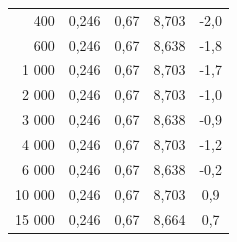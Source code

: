 \documentclass[a4paper, czech]{article}
\begin{document}
\begin{table}[H]
\begin{tabular}{rcccc}
        400        & 0,246                                                                       & 0,67                           & 8,703                                                        & -2,0                                                        \\
        600        & 0,246                                                                       & 0,67                           & 8,638                                                        & -1,8                                                        \\
        1 000       & 0,246                                                                       & 0,67                           & 8,703                                                        & -1,7                                                        \\
        2 000       & 0,246                                                                       & 0,67                           & 8,703                                                        & -1,0                                                        \\
        3 000       & 0,246                                                                       & 0,67                           & 8,638                                                        & -0,9                                                        \\
        4 000       & 0,246                                                                       & 0,67                           & 8,703                                                        & -1,2                                                        \\
        6 000       & 0,246                                                                       & 0,67                           & 8,638                                                        & -0,2                                                        \\
        10 000      & 0,246                                                                       & 0,67                           & 8,703                                                        & 0,9                                                         \\
        15 000      & 0,246                                                                       & 0,67                           & 8,664                                                        & 0,7                                                         \\

\end{tabular}
\end{table}
\end{document}
